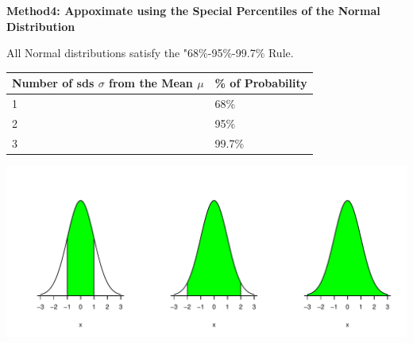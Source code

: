\documentclass[t,xcolor=pdftex,dvipsnames,table]{beamer}\usepackage[]{graphicx}\usepackage[]{color}
\makeatletter
\def\maxwidth{ %
  \ifdim\Gin@nat@width>\linewidth
    \linewidth
  \else
    \Gin@nat@width
  \fi
}
\newenvironment{knitrout}{}{} %
\makeatother
\begin{document}
\begin{frame}[fragile]\frametitle{}

{\bf Method4: Appoximate using the Special Percentiles of the Normal Distribution} 

All Normal distributions satisfy the "68\%-95\%-99.7\% Rule. \\

\vspace{.5cm}
\begin{tabular}{|l|l|} \hline
Number of sds $\sigma$ from the Mean $\mu$ & \% of Probability \\ \hline
1 & 68\%  \\
2 & 95\% \\
3 & 99.7\% \\ \hline
\end{tabular}


\begin{knitrout}
\color{fgcolor}
\includegraphics[width=\maxwidth]{figure/unnamed-chunk-94-1} 

\end{knitrout}

\end{frame}
\end{document}
